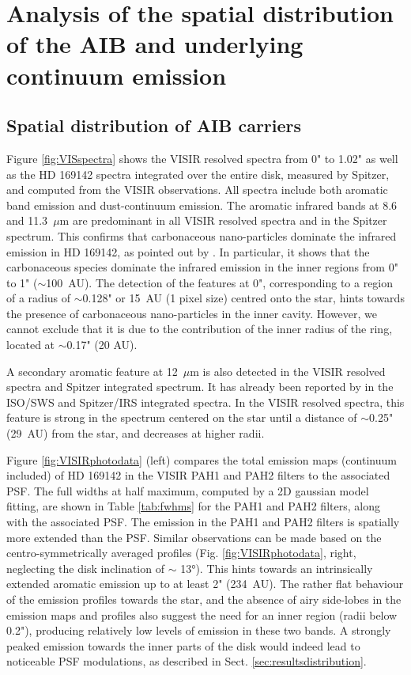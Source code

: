 \documentclass{aa}
\newcommand{\mic}{~$\mu$m\xspace}
\begin{document}
\section{Analysis of the spatial distribution of the AIB and underlying continuum emission} \label{sec:obsresults}
\subsection{Spatial distribution of AIB carriers}
Figure \ref{fig:VISspectra} shows the VISIR resolved spectra from 0" to 1.02" as well as the HD 169142 spectra integrated over the entire disk, measured by Spitzer, and computed from the VISIR observations. All spectra include both aromatic band emission and dust-continuum emission. The aromatic infrared bands at 8.6 and 11.3\mic are predominant in all VISIR resolved spectra and in the Spitzer spectrum. This confirms that carbonaceous nano-particles dominate the infrared emission in HD 169142, as pointed out by \citet{Seok_2016}. In particular, it shows that the carbonaceous species dominate the infrared emission  in the inner regions from 0" to 1" ($\sim$100~AU). 
The detection of the features at 0", corresponding to a region of a radius of $\sim$0.128" or 15~AU (1 pixel size) centred onto the star, hints towards the presence of carbonaceous nano-particles in the inner cavity. However, we cannot exclude that it is due to the contribution of the inner radius of the ring, located at $\sim$0.17" (20 AU).

A secondary aromatic feature at 12\mic is also detected in the VISIR resolved spectra and Spitzer integrated spectrum. It has already been reported by \citet{Maaskant2013, Seok_2016} in the ISO/SWS and Spitzer/IRS integrated spectra. In the VISIR resolved spectra, this feature is strong in the spectrum centered on the star until a distance of $\sim$0.25" (29~AU) from the star, and decreases at higher radii.

Figure \ref{fig:VISIRphotodata} (left) compares the total emission maps (continuum included) of HD 169142 in the VISIR PAH1 and PAH2 filters to the associated PSF. The full widths at half maximum, computed by a 2D gaussian model fitting, are shown in Table \ref{tab:fwhms} for the PAH1 and PAH2 filters, along with the associated PSF. The emission in the PAH1 and PAH2 filters is spatially more extended than the PSF. Similar observations can be made based on the centro-symmetrically averaged profiles (Fig. \ref{fig:VISIRphotodata}, right, neglecting the disk inclination of $\sim$ \ang{13}). This hints towards an intrinsically extended aromatic emission up to at least 2" (234~AU). The rather flat behaviour of the emission profiles towards the star, and the absence of airy side-lobes in the emission maps and profiles also suggest the need for an inner region (radii below 0.2"), producing relatively low levels of emission in these two bands. A strongly peaked emission towards the inner parts of the disk would indeed lead to noticeable PSF modulations, as described in Sect. \ref{sec:resultsdistribution}.
\end{document}
